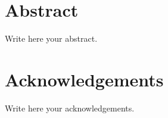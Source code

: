 
\section*{Abstract}
Write here your abstract.

\newpage


\section*{Acknowledgements}
Write here your acknowledgements.